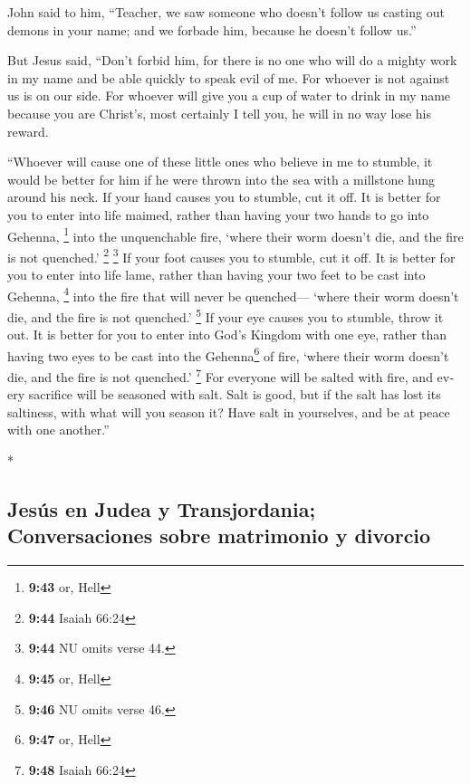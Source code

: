 \begin{paracol}{2}
\begin{otherlanguage}{english}
 John said to him, ``Teacher, we saw someone who doesn't
follow us casting out demons in your name; and we forbade him, because
he doesn't follow us.''

 But Jesus said, ``Don't forbid him, for there is no one
who will do a mighty work in my name and be able quickly to speak evil
of me.  For whoever is not against us is on our side.
 For whoever will give you a cup of water to drink in my
name because you are Christ's, most certainly I tell you, he will in no
way lose his reward.

 ``Whoever will cause one of these little ones who
believe in me to stumble, it would be better for him if he were thrown
into the sea with a millstone hung around his neck.  If
your hand causes you to stumble, cut it off. It is better for you to
enter into life maimed, rather than having your two hands to go into
Gehenna, \footnote{\textbf{9:43} or, Hell} into the unquenchable fire,
 `where their worm doesn't die, and the fire is not
quenched.' \footnote{\textbf{9:44} Isaiah 66:24} \footnote{\textbf{9:44}
  NU omits verse 44.}  If your foot causes you to
stumble, cut it off. It is better for you to enter into life lame,
rather than having your two feet to be cast into Gehenna, \footnote{\textbf{9:45}
  or, Hell} into the fire that will never be quenched--- 
`where their worm doesn't die, and the fire is not quenched.'
\footnote{\textbf{9:46} NU omits verse 46.}  If your eye
causes you to stumble, throw it out. It is better for you to enter into
God's Kingdom with one eye, rather than having two eyes to be cast into
the Gehenna\footnote{\textbf{9:47} or, Hell} of fire, 
`where their worm doesn't die, and the fire is not quenched.'
\footnote{\textbf{9:48} Isaiah 66:24}  For everyone will
be salted with fire, and every sacrifice will be seasoned with salt.
 Salt is good, but if the salt has lost its saltiness,
with what will you season it? Have salt in yourselves, and be at peace
with one another.''

\end{otherlanguage}

\switchcolumn[0]*

\hypertarget{jesuxfas-en-judea-y-transjordania-conversaciones-sobre-matrimonio-y-divorcio}{%
\subsection{Jesús en Judea y Transjordania; Conversaciones sobre
matrimonio y
divorcio}\label{jesuxfas-en-judea-y-transjordania-conversaciones-sobre-matrimonio-y-divorcio}}


\end{paracol}
